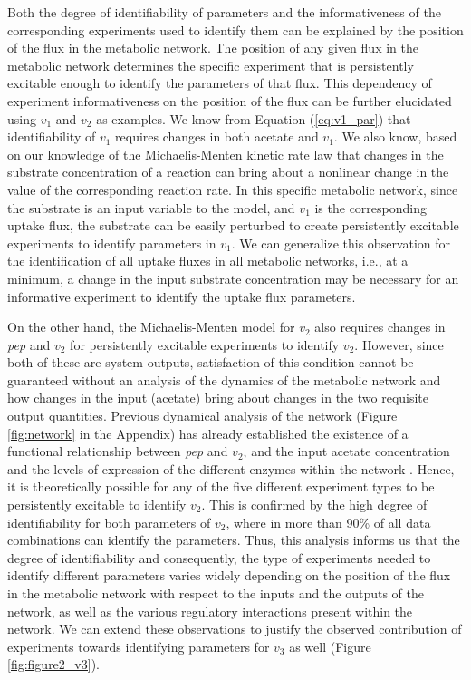 \documentclass[10pt]{article}
\begin{document}
Both the degree of identifiability of parameters and the informativeness of the corresponding experiments used to identify them can be explained by the position of the flux in the metabolic network. The position of any given flux in the metabolic network determines the specific experiment that is persistently excitable enough to identify the parameters of that flux. This dependency of experiment informativeness on the position of the flux can be further elucidated using $v_1$ and $v_2$ as examples. We know from Equation (\ref{eq:v1_par}) that identifiability of $v_1$ requires changes in both acetate and $v_1$. We also know, based on our knowledge of the Michaelis-Menten kinetic rate law that changes in the substrate concentration of a reaction can bring about a nonlinear change in the value of the corresponding reaction rate. In this specific metabolic network, since the substrate is an input variable to the model, and $v_1$ is the corresponding uptake flux, the substrate can be easily perturbed to create persistently excitable experiments to identify parameters in $v_1$. We can generalize this observation for the identification of all uptake fluxes in all metabolic networks, i.e., at a minimum, a change in the input substrate concentration may be necessary for an informative experiment to identify the uptake flux parameters. 

On the other hand, the Michaelis-Menten model for $v_2$ also requires changes in \textit{pep} and $v_2$ for persistently excitable experiments to identify $v_2$. However, since both of these are system outputs, satisfaction of this condition cannot be guaranteed without an analysis of the dynamics of the metabolic network and how changes in the input (acetate) bring about changes in the two requisite output quantities. Previous dynamical analysis of the network (Figure \ref{fig:network} in the Appendix) has already established the existence of a functional relationship between \textit{pep} and $v_2$, and the input acetate concentration and the levels of expression of the different enzymes within the network \parencite{Srinivasan2017}. Hence, it is theoretically possible for any of the five different experiment types to be persistently excitable to identify $v_2$. This is confirmed by the high degree of identifiability for both parameters of $v_2$, where in more than 90\% of all data combinations can identify the parameters. Thus, this analysis informs us that the degree of identifiability and consequently, the type of experiments needed to identify different parameters varies widely depending on the position of the flux in the metabolic network with respect to the inputs and the outputs of the network, as well as the various regulatory interactions present within the network. We can extend these observations to justify the observed contribution of experiments towards identifying parameters for $v_3$ as well (Figure \ref{fig:figure2_v3}).	
\end{document}
